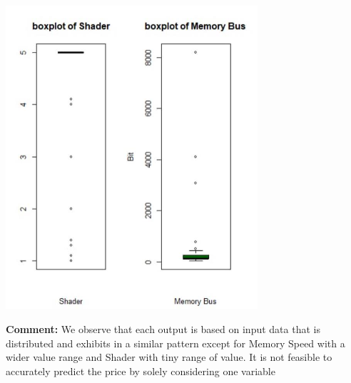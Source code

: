 \begin{center}
    \includegraphics[width=0.7\textwidth]{bp6.png}
\end{center}
\tab \textbf{Comment:} We observe that each output is based on input data that is distributed and exhibits in a similar pattern except for Memory Speed with a wider value range and Shader with tiny range of value. It is not feasible to accurately predict the price by solely considering one variable